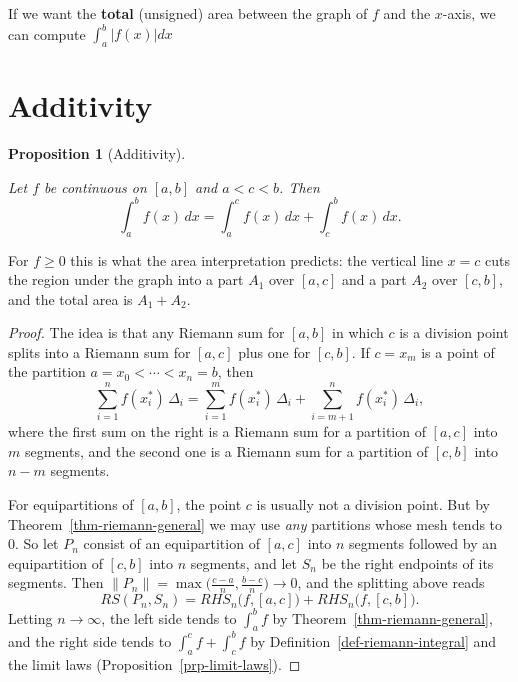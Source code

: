 \documentclass[
  letterpaper,
  DIV=11,
  numbers=noendperiod]{scrreprt}
\theoremstyle{plain}
\theoremstyle{plain}
\newtheorem{proposition}{Proposition}[chapter]
\theoremstyle{definition}
\theoremstyle{definition}
\theoremstyle{definition}
\theoremstyle{plain}
\theoremstyle{plain}
\theoremstyle{remark}
\begin{document}
If we want the \textbf{total} (unsigned) area between the graph of \(f\)
and the \(x\)-axis, we can compute \(\int_a^b |f(x)| dx\)

\section{Additivity}\label{additivity}

\begin{proposition}[Additivity]\protect\hypertarget{prp-additivity}{}\label{prp-additivity}

Let \(f\) be continuous on \([a,b]\) and \(a<c<b\). Then \[
\int_a^b f(x)\,dx = \int_a^c f(x)\,dx + \int_c^b f(x)\,dx.
\]

\end{proposition}

For \(f\ge0\) this is what the area interpretation predicts: the
vertical line \(x=c\) cuts the region under the graph into a part
\(A_1\) over \([a,c]\) and a part \(A_2\) over \([c,b]\), and the total
area is \(A_1+A_2\).

\begin{proof}
The idea is that any Riemann sum for \([a,b]\) in which \(c\) is a
division point splits into a Riemann sum for \([a,c]\) plus one for
\([c,b]\). If \(c = x_m\) is a point of the partition
\(a=x_0<\cdots<x_n=b\), then \[
\sum_{i=1}^n f(x_i^*)\,\Delta_i = \sum_{i=1}^m f(x_i^*)\,\Delta_i + \sum_{i=m+1}^n f(x_i^*)\,\Delta_i ,
\] where the first sum on the right is a Riemann sum for a partition of
\([a,c]\) into \(m\) segments, and the second one is a Riemann sum for a
partition of \([c,b]\) into \(n-m\) segments.

For equipartitions of \([a,b]\), the point \(c\) is usually not a
division point. But by Theorem~\ref{thm-riemann-general} we may use
\emph{any} partitions whose mesh tends to \(0\). So let \(P_n\) consist
of an equipartition of \([a,c]\) into \(n\) segments followed by an
equipartition of \([c,b]\) into \(n\) segments, and let \(S_n\) be the
right endpoints of its segments. Then
\(\|P_n\| = \max\big(\tfrac{c-a}{n},\tfrac{b-c}{n}\big)\to0\), and the
splitting above reads \[
RS(P_n,S_n) = RHS_n\big(f,[a,c]\big) + RHS_n\big(f,[c,b]\big).
\] Letting \(n\to\infty\), the left side tends to \(\int_a^b f\) by
Theorem~\ref{thm-riemann-general}, and the right side tends to
\(\int_a^c f + \int_c^b f\) by Definition~\ref{def-riemann-integral} and
the limit laws (Proposition~\ref{prp-limit-laws}).
\end{proof}
\end{document}

